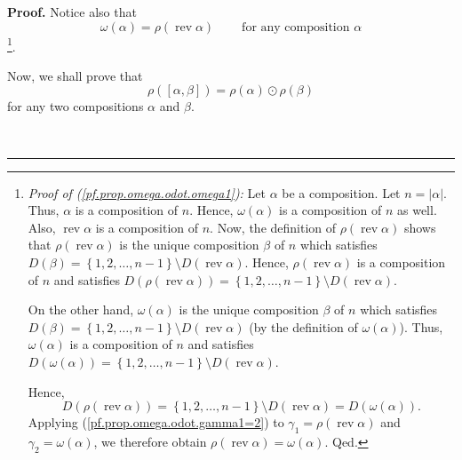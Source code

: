 \documentclass[numbers=enddot,12pt,final,onecolumn,notitlepage,abstracton]{scrartcl}%
\theoremstyle{definition}
\newenvironment{proof}[1][Proof]{\noindent\textbf{#1.} }{\ \rule{0.5em}{0.5em}}
\newenvironment{verlong}{}{}
\begin{document}
\begin{verlong}
\begin{proof}
Notice also that%
\begin{equation}
\omega\left(  \alpha\right)  =\rho\left(  \operatorname*{rev}\alpha\right)
\ \ \ \ \ \ \ \ \ \ \text{for any composition }\alpha
\label{pf.prop.omega.odot.omega1}%
\end{equation}
\footnote{\textit{Proof of (\ref{pf.prop.omega.odot.omega1}):} Let $\alpha$ be
a composition. Let $n=\left\vert \alpha\right\vert $. Thus, $\alpha$ is a
composition of $n$. Hence, $\omega\left(  \alpha\right)  $ is a composition of
$n$ as well. Also, $\operatorname*{rev}\alpha$ is a composition of $n$. Now,
the definition of $\rho\left(  \operatorname*{rev}\alpha\right)  $ shows that
$\rho\left(  \operatorname*{rev}\alpha\right)  $ is the unique composition
$\beta$ of $n$ which satisfies $D\left(  \beta\right)  =\left\{
1,2,\ldots,n-1\right\}  \setminus D\left(  \operatorname*{rev}\alpha\right)
$. Hence, $\rho\left(  \operatorname*{rev}\alpha\right)  $ is a composition of
$n$ and satisfies $D\left(  \rho\left(  \operatorname*{rev}\alpha\right)
\right)  =\left\{  1,2,\ldots,n-1\right\}  \setminus D\left(
\operatorname*{rev}\alpha\right)  $.
\par
On the other hand, $\omega\left(  \alpha\right)  $ is the unique composition
$\beta$ of $n$ which satisfies $D\left(  \beta\right)  =\left\{
1,2,\ldots,n-1\right\}  \setminus D\left(  \operatorname*{rev}\alpha\right)  $
(by the definition of $\omega\left(  \alpha\right)  $). Thus, $\omega\left(
\alpha\right)  $ is a composition of $n$ and satisfies $D\left(  \omega\left(
\alpha\right)  \right)  =\left\{  1,2,\ldots,n-1\right\}  \setminus D\left(
\operatorname*{rev}\alpha\right)  $.
\par
Hence,%
\[
D\left(  \rho\left(  \operatorname*{rev}\alpha\right)  \right)  =\left\{
1,2,\ldots,n-1\right\}  \setminus D\left(  \operatorname*{rev}\alpha\right)
=D\left(  \omega\left(  \alpha\right)  \right)  .
\]
Applying (\ref{pf.prop.omega.odot.gamma1=2}) to $\gamma_{1}=\rho\left(
\operatorname*{rev}\alpha\right)  $ and $\gamma_{2}=\omega\left(
\alpha\right)  $, we therefore obtain $\rho\left(  \operatorname*{rev}%
\alpha\right)  =\omega\left(  \alpha\right)  $. Qed.}.

Now, we shall prove that%
\begin{equation}
\rho\left(  \left[  \alpha,\beta\right]  \right)  =\rho\left(  \alpha\right)
\odot\rho\left(  \beta\right)  \label{pf.prop.omega.odot.1}%
\end{equation}
for any two compositions $\alpha$ and $\beta$.


\end{proof}
\end{verlong}
\end{document}
